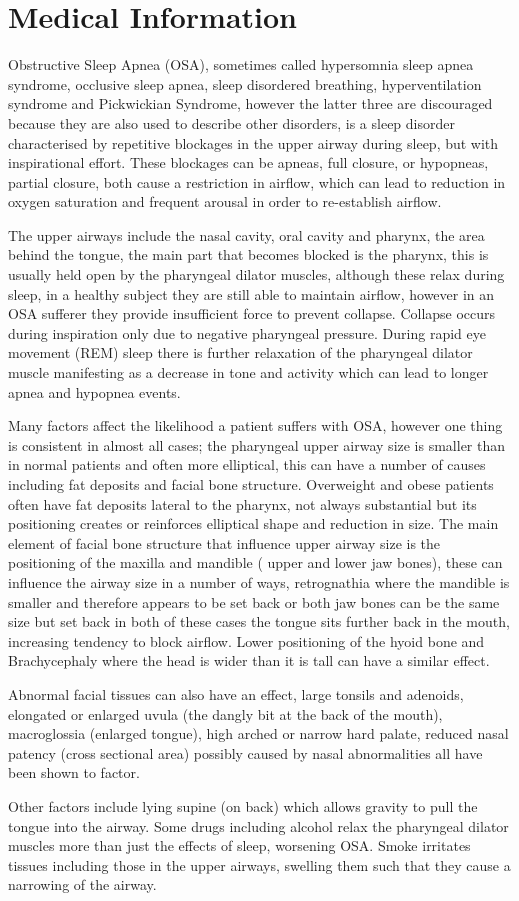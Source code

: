 \chapter{Medical Information}
\label{ch:medicalInfo}
Obstructive Sleep Apnea (OSA), sometimes called hypersomnia sleep apnea syndrome, occlusive sleep apnea, sleep disordered breathing, hyperventilation syndrome and Pickwickian Syndrome, however the latter three are discouraged because they are also used to describe other disorders, is a sleep disorder characterised by repetitive blockages in the upper airway during sleep, but with inspirational effort. These blockages can be apneas, full closure, or hypopneas, partial closure, both cause a restriction in airflow, which can lead to reduction in oxygen saturation and frequent arousal in order to re-establish airflow. 

The upper airways include the nasal cavity, oral cavity and pharynx, the area behind the tongue, the main part that becomes blocked is the pharynx, this is usually held open by the pharyngeal dilator muscles, although these relax during sleep, in a healthy subject they are still able to maintain airflow, however in an OSA sufferer they provide insufficient force to prevent collapse. Collapse occurs during inspiration only due to negative pharyngeal pressure. During rapid eye movement (REM) sleep there is further relaxation of the pharyngeal dilator muscle manifesting as a decrease in tone and activity which can lead to longer apnea and hypopnea events. 

Many factors affect the likelihood a patient suffers with OSA, however one thing is consistent in almost all cases; the pharyngeal upper airway size is smaller than in normal patients and often more elliptical, this can have a number of causes including fat deposits and facial bone structure. Overweight and obese patients often have fat deposits lateral to the pharynx, not always substantial but its positioning creates or reinforces elliptical shape and reduction in size. The main element of facial bone structure that influence upper airway size is the positioning of the maxilla and mandible ( upper and lower jaw bones), these can influence the airway size in a number of ways, retrognathia where the mandible is smaller and therefore appears to be set back or both jaw bones can be the same size but set back in both of these cases the tongue sits further back in the mouth, increasing tendency to block airflow. Lower positioning of the hyoid bone and Brachycephaly where the head is wider than it is tall can have a similar effect. 

Abnormal facial tissues can also have an effect, large tonsils and adenoids, elongated or enlarged uvula (the dangly bit at the back of the mouth), macroglossia (enlarged tongue), high arched or narrow hard palate, reduced nasal patency (cross sectional area) possibly caused by nasal abnormalities all have been shown to factor.

Other factors include lying supine (on back) which allows gravity to pull the tongue into the airway. Some drugs including alcohol relax the pharyngeal dilator muscles more than just the effects of sleep, worsening OSA. Smoke irritates tissues including those in the upper airways, swelling them such that they cause a narrowing of the airway.